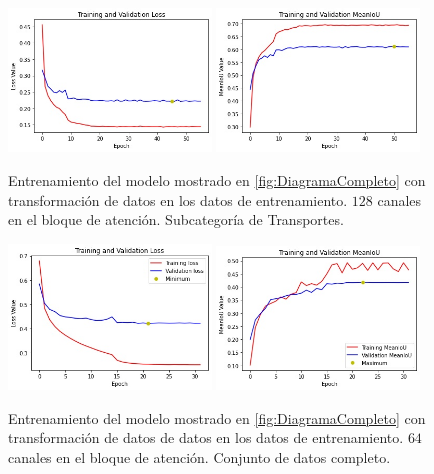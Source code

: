 \begin{figure}[h!]
  \centering
  \includegraphics[width=0.48\textwidth]{../../modelos-entrenados/unet-nonlocal/ejecucion5/loss}
  \includegraphics[width=0.48\textwidth]{../../modelos-entrenados/unet-nonlocal/ejecucion5/iou}
  \caption{Entrenamiento del modelo mostrado en \autoref{fig:DiagramaCompleto} con transformación de datos en los datos de entrenamiento. $128$ canales en el bloque de atención. Subcategoría de Transportes.}
  \label{fig:ejec5}
\end{figure}

\begin{figure}[h!]
  \centering
  \includegraphics[width=0.48\textwidth]{../../modelos-entrenados/unet-nonlocal/ejecucion7/loss}
  \includegraphics[width=0.48\textwidth]{../../modelos-entrenados/unet-nonlocal/ejecucion7/iou}
  \caption{Entrenamiento del modelo mostrado en \autoref{fig:DiagramaCompleto} con transformación de datos de datos en los datos de entrenamiento. $64$ canales en el bloque de atención. Conjunto de datos completo.}
  \label{fig:ejec7}
\end{figure}

